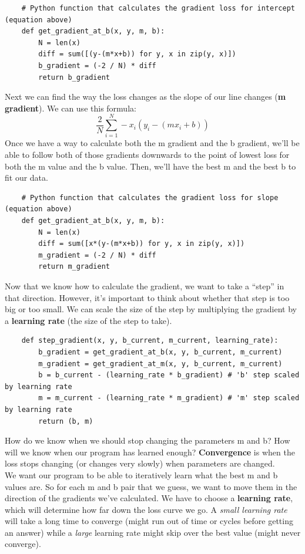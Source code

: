 \documentclass[11pt, a4paper]{article}
\begin{document}
\begin{spacing}{1.1}
	\begin{lstlisting}
	# Python function that calculates the gradient loss for intercept (equation above)
	def get_gradient_at_b(x, y, m, b):
		N = len(x) 
		diff = sum([(y-(m*x+b)) for y, x in zip(y, x)])
		b_gradient = (-2 / N) * diff
		return b_gradient \end{lstlisting}\vspace*{1mm}
	Next we can find the way the loss changes as the slope of our line changes (\textbf{m gradient}). We can use this formula: $$ \frac{2}{N} \sum_{i=1}^{N} -x_i(y_i - (mx_i + b)) $$ Once we have a way to calculate both the m gradient and the b gradient, we’ll be able to follow both of those gradients downwards to the point of lowest loss for both the m value and the b value. Then, we’ll have the best m and the best b to fit our data.
	\begin{lstlisting}
	# Python function that calculates the gradient loss for slope (equation above)
	def get_gradient_at_b(x, y, m, b):
		N = len(x) 
		diff = sum([x*(y-(m*x+b)) for y, x in zip(y, x)])
		m_gradient = (-2 / N) * diff
		return m_gradient \end{lstlisting}\vspace*{1mm}
	Now that we know how to calculate the gradient, we want to take a “step” in that direction. However, it’s important to think about whether that step is too big or too small. We can scale the size of the step by multiplying the gradient by a \textbf{learning rate} (the size of the step to take).  
	\begin{lstlisting}
	def step_gradient(x, y, b_current, m_current, learning_rate):
		b_gradient = get_gradient_at_b(x, y, b_current, m_current) 
		m_gradient = get_gradient_at_m(x, y, b_current, m_current)
		b = b_current - (learning_rate * b_gradient) # 'b' step scaled by learning rate
		m = m_current - (learning_rate * m_gradient) # 'm' step scaled by learning rate
		return (b, m) \end{lstlisting}\vspace*{1mm}
	How do we know when we should stop changing the parameters m and b? How will we know when our program has learned enough? \textbf{Convergence} is when the loss stops changing (or changes very slowly) when parameters are changed. \vspace*{2mm} \\
	We want our program to be able to iteratively learn what the best m and b values are. So for each m and b pair that we guess, we want to move them in the direction of the gradients we’ve calculated. We have to choose a \textbf{learning rate}, which will determine how far down the loss curve we go. A \textit{small learning rate} will take a long time to converge (might run out of time or cycles before getting an answer) while a \textit{large} learning rate might skip over the best value (might never converge). \vspace*{1mm} \\

\end{spacing}
\end{document}
